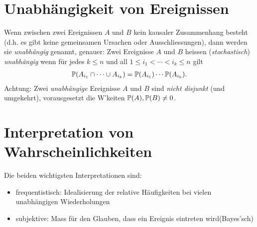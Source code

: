 \section{Unabhängigkeit von Ereignissen}
Wenn zwischen zwei Ereignissen $A$ und $B$ kein kausaler Zusammenhang besteht (d.h. es gibt keine gemeinsamen Ursachen oder Ausschliessungen), dann werden sie \emph{unabhängig} genannt, genauer: Zwei Ereignisse $A$ und $B$ heissen (\emph{stochastisch}) \emph{unabhängig} wenn für jedes $k\leq n$ und all $1\leq i_1< \cdots < i_k \leq n$ gilt
\begin{gather*}
	\mathbb P(A_{i_1}\cap \cdots \cup A_{i_{k}})=\mathbb P(A_{i_1})\cdots \mathbb P(A_{i_k}).
\end{gather*}
Achtung: Zwei \emph{unabhängige} Ereignisse $A$ und $B$ sind \emph{nicht disjunkt} (und umgekehrt), vorausgesetzt die W'keiten $\mathbb P(A), \mathbb P(B) \neq 0$.

\section{Interpretation von Wahrscheinlichkeiten}
Die beiden wichtigsten Interpretationen sind:
\begin{itemize}
	\item frequentistisch: \glqq Idealisierung der relative Häufigkeiten bei vielen unabhängigen Wiederholungen\grqq
	\item subjektive: \glqq Mass für den Glauben, dass ein Ereignis eintreten wird\grqq (Bayes'sch)
\end{itemize}

